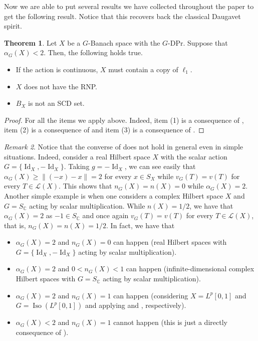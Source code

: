 \documentclass[a4paper,12pt]{amsart}
\theoremstyle{definition}
\newtheorem{theorem}{Theorem}[section]
\theoremstyle{definition}
\theoremstyle{remark}
\newtheorem{remark}[theorem]{Remark}
\numberwithin{equation}{section}
\newcommand{\C}{\mathbb{C}}
\DeclareMathOperator{\id}{Id}
\DeclareMathOperator{\iso}{Iso}
\renewcommand{\geq}{\geqslant}
\newcommand{\<}{\langle}
\renewcommand{\>}{\rangle}
\begin{document}
	Now we are able to put several results we have collected throughout the paper to get the following result. Notice that this recovers back the classical Daugavet spirit.
	
	\begin{theorem} \label{theorem:all-together} Let $X$ be a $G$-Banach space with the $G$-DPr. Suppose that $\alpha_G(X) < 2$. Then, the following holds true.
		\begin{itemize}
			\item[(1)] If the action is continuous, $X$ must contain a copy of $\ell_1$.
			\item[(2)] $X$ does not have the RNP.
			\item[(3)] $B_X$ is not an SCD set.
		\end{itemize}
	\end{theorem}
	
	\begin{proof} For all the items we apply  above. Indeed, item (1) is a consequence of , item (2) is a consequence of  and item (3) is a consequence of .
	\end{proof}
	
	\begin{remark} Notice that the converse of  does not hold in general even in simple situations. Indeed, consider a real Hilbert space $X$ with the scalar action $G = \{ \id_X, - \id_X \}$. Taking $g=-\id_X$, we can see easily that $\alpha_G(X) \geq \|(-x) - x\| = 2$ for every $x \in S_X$ while $v_G(T) = v(T)$ for every $T \in \mathcal{L}(X)$. This shows that $n_G(X) = n(X) = 0$ while $\alpha_G(X) = 2$. Another simple example is when one considers a complex Hilbert space $X$ and $G= S_{\C}$ acting by scalar multiplication. While $n(X) = 1/2$, we have that $\alpha_G(X) = 2$ as $-1 \in S_{\C}$ and once again $v_G(T) = v(T)$ for every $T \in \mathcal{L}(X)$, that is, $n_G(X) = n(X) = 1/2$. In fact, we have that 
		\begin{itemize}
			\item $\alpha_G(X) = 2$ and $n_G(X) = 0$ can happen (real Hilbert spaces with $G=\{\id_X, - \id_X\}$ acting by scalar multiplication).
			\item $\alpha_G(X) = 2$ and $0<n_G(X)<1$ can happen (infinite-dimensional complex Hilbert spaces with $G=S_{\C}$ acting by scalar multiplication).
			\item $\alpha_G(X) = 2$ and $n_G(X) = 1$ can happen (considering $X=L^p[0,1]$ and $G=\iso(L^p[0,1])$ and applying  and , respectively).
			\item $\alpha_G(X) < 2$ and $n_G(X) = 1$ cannot happen (this is just a directly consequence of ).
		\end{itemize}
	\end{remark}
	
\end{document}
